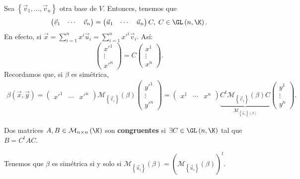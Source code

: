 Sea $\displaystyle \left\{ \vec{v}_{1}, \ldots, \vec{v}_{n}\right\}  $ otra base de $\displaystyle V $. Entonces, tenemos que 
	\[ \begin{pmatrix} \vec{v}_{1} & \cdots & \vec{v}_{n} \end{pmatrix} = \begin{pmatrix} \vec{u}_{1} & \cdots & \vec{u}_{n} \end{pmatrix}C, \; C \in \GL\left(n, \K\right) .\]
En efecto, si $\displaystyle \vec{x} = \sum^{n}_{i = 1}x^{i}\vec{u}_{i} = \sum^{n}_{i = 1}x'^{i}\vec{v}_{i} $. Así:
\[ \begin{pmatrix} x'^{1} \\ \vdots \\ x'^{n} \end{pmatrix} = C \begin{pmatrix} x^{1} \\ \vdots \\ x^{n} \end{pmatrix} .\]
Recordamos que, si $\displaystyle \beta  $ es simétrica, 
	\[
	\begin{split}
			\beta\left(\vec{x}, \vec{y}\right) =  \begin{pmatrix} x'^{1} & \cdots & x'^{n} \end{pmatrix} \mathcal{M}_{ \left\{ \vec{v}_{i}\right\} }\left(\beta \right)\begin{pmatrix} y'^{1} \\ \vdots \\ y'^{n} \end{pmatrix} 
				=   \begin{pmatrix} x^{1} & \cdots & x^{n} \end{pmatrix} \underbrace{C^{t}\mathcal{M}_{ \left\{ \vec{v}_{i}\right\} }\left(\beta \right) C}_{\mathcal{M}_{ \left\{ \vec{u}_{i}\right\} \left(\beta\right)}} \begin{pmatrix}y^{1} \\ \vdots \\ y^{n} \end{pmatrix} .
	\end{split}
	\]
\begin{fdefinition}[]
\normalfont Dos matrices $\displaystyle A,B \in \mathcal{M}_{n \times n}\left(\K\right) $ son \textbf{congruentes} si $\displaystyle \exists C \in \GL\left(n, \K\right) $ tal que $\displaystyle B = C^{t}AC $.
\end{fdefinition}
\begin{observation}
	\normalfont Tenemos que $\displaystyle \beta  $ es simétrica si y solo si $\displaystyle \mathcal{M}_{ \left\{ \vec{u}_{i}\right\} }\left(\beta \right) = \left( \mathcal{M}_{ \left\{ \vec{u}_{i}\right\} }\left(\beta \right)\right)^{t}   $.
\end{observation}
